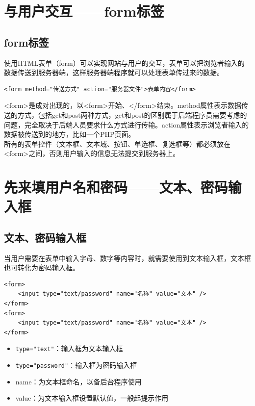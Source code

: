 \newpage

\section{与用户交互——form标签}

\subsection{form标签}

使用HTML表单（form）可以实现网站与用户的交互，表单可以把浏览者输入的数据传送到服务器端，这样服务器端程序就可以处理表单传过来的数据。\\

\begin{lstlisting}[style=htmlcssjs]
<form method="传送方式" action="服务器文件">表单内容</form>
\end{lstlisting}

<form>是成对出现的，以<form>开始、</form>结束。method属性表示数据传送的方式，包括get和post两种方式，get和post的区别属于后端程序员需要考虑的问题，完全取决于后端人员要求什么方式进行传输。action属性表示浏览者输入的数据被传送到的地方，比如一个PHP页面。\\

所有的表单控件（文本框、文本域、按钮、单选框、复选框等）都必须放在<form>之间，否则用户输入的信息无法提交到服务器上。

\newpage

\section{先来填用户名和密码——文本、密码输入框}

\subsection{文本、密码输入框}

当用户需要在表单中输入字母、数字等内容时，就需要使用到文本输入框，文本框也可转化为密码输入框。\\

\begin{lstlisting}[style=htmlcssjs]
<form>
    <input type="text/password" name="名称" value="文本" />
</form>
<form>
    <input type="text/password" name="名称" value="文本" />
</form>
\end{lstlisting}

\begin{itemize}
	\item \lstinline|type="text"|：输入框为文本输入框
	\item \lstinline|type="password"|：输入框为密码输入框
	\item name：为文本框命名，以备后台程序使用
	\item value：为文本输入框设置默认值，一般起提示作用
\end{itemize}

